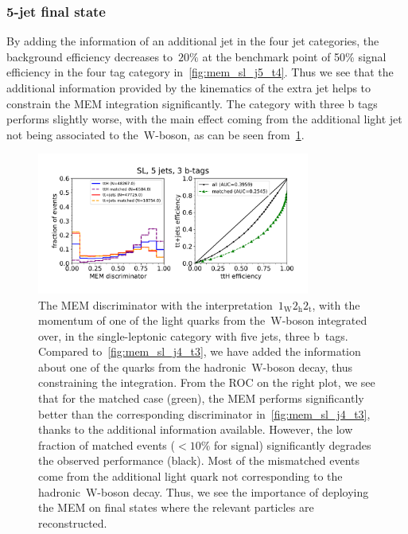 \subsubsection{5-jet final state}
By adding the information of an additional jet in the four jet categories, the background efficiency decreases to~$20\%$ at the benchmark point of 50\% signal efficiency in the four tag category in~\cref{fig:mem_sl_j5_t4}. Thus we see that the additional information provided by the kinematics of the extra jet helps to constrain the MEM integration significantly. The category with three b tags performs slightly worse, with the main effect coming from the additional light jet not being associated to the~$\mathrm{W}$-boson, as can be seen from~\cref{fig:mem_sl_j5_t3}.

\begin{figure}[ht]
\begin{centering}
\includegraphics[width = 0.8\textwidth]{figures/mem/mem_sl_j5_t3.pdf}
\caption[MEM with the~$1_{\mathrm{W}} 2_{\mathrm{h}} 2_{\mathrm{t}}$ interpretation in the 5 jet, 3 b~tag category]{The MEM discriminator with the interpretation~$1_{\mathrm{W}} 2_{\mathrm{h}} 2_{\mathrm{t}}$, with the momentum of one of the light quarks from the~$\mathrm{W}$-boson integrated over, in the single-leptonic category with five jets, three b~tags. Compared to~\cref{fig:mem_sl_j4_t3}, we have added the information about one of the quarks from the hadronic~$\mathrm{W}$-boson decay, thus constraining the integration. From the ROC on the right plot, we see that for the matched case (green), the MEM performs significantly better than the corresponding discriminator in~\cref{fig:mem_sl_j4_t3}, thanks to the additional information available. However, the low fraction of matched events ($< 10\%$ for signal) significantly degrades the observed performance (black). Most of the mismatched events come from the additional light quark not corresponding to the hadronic~$\mathrm{W}$-boson decay. Thus, we see the importance of deploying the MEM on final states where the relevant particles are reconstructed.}
\label{fig:mem_sl_j5_t3}
\end{centering}
\end{figure}

